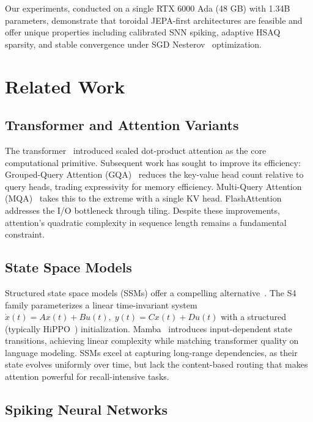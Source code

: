 \documentclass[conference]{IEEEtran}
\begin{document}
Our experiments, conducted on a single RTX 6000 Ada (48 GB) with 1.34B parameters, demonstrate that toroidal JEPA-first architectures are feasible and offer unique properties including calibrated SNN spiking, adaptive HSAQ sparsity, and stable convergence under SGD Nesterov~\cite{sutskever2013importance} optimization.

\section{Related Work}

\subsection{Transformer and Attention Variants}

The transformer~\cite{vaswani2017attention} introduced scaled dot-product attention as the core computational primitive. Subsequent work has sought to improve its efficiency: Grouped-Query Attention (GQA)~\cite{ainslie2023gqa} reduces the key-value head count relative to query heads, trading expressivity for memory efficiency. Multi-Query Attention (MQA)~\cite{shazeer2019fast} takes this to the extreme with a single KV head. FlashAttention~\cite{dao2022flashattention} addresses the I/O bottleneck through tiling. Despite these improvements, attention's quadratic complexity in sequence length remains a fundamental constraint.

\subsection{State Space Models}

Structured state space models (SSMs) offer a compelling alternative~\cite{gu2021efficiently}. The S4 family parameterizes a linear time-invariant system $\dot{x}(t) = Ax(t) + Bu(t),\; y(t) = Cx(t) + Du(t)$ with a structured (typically HiPPO~\cite{gu2020hippo}) initialization. Mamba~\cite{gu2023mamba} introduces input-dependent state transitions, achieving linear complexity while matching transformer quality on language modeling. SSMs excel at capturing long-range dependencies, as their state evolves uniformly over time, but lack the content-based routing that makes attention powerful for recall-intensive tasks.

\subsection{Spiking Neural Networks}
\end{document}
